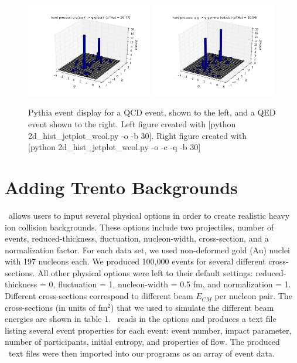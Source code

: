 \documentclass[11pt]{article}
\begin{document}
\begin{figure}[h]
\begin{center}
\includegraphics[width=0.49\textwidth]{2d_hist_jetplot.png}
\includegraphics[width=0.49\textwidth]{2d_hist_jetplot2.png}
\label{fig_label}
\caption{Pythia event display for a QCD event, shown to the left, and a QED event shown to the right.  Left figure created with [python 2d\_hist\_jetplot\_wcol.py -o -b 30]. Right figure created with [python 2d\_hist\_jetplot\_wcol.py -o -c -q -b 30]}
\end{center}
\end{figure}

\section{Adding Trento Backgrounds}
%
%
\trento\ allows users to input several physical options in order to create realistic heavy ion collision backgrounds. These options include two projectiles, number of events, reduced-thickness, fluctuation, nucleon-width, cross-section, and a normalization factor. For each data set,  we used non-deformed gold (Au) nuclei with 197 nucleons each. We produced 100,000 events for several different cross-sections. All other physical options were left to their default settings: reduced-thickness = 0, fluctuation = 1, nucleon-width = 0.5 fm, and normalization = 1. Different cross-sections correspond to different beam $E_{CM}$ per nucleon pair. The cross-sections (in units of fm$^2$) that we used to simulate the different beam energies are shown in table 1. \trento\ reads in the options and produces a text file listing several event properties for each event: event number, impact parameter, number of participants, initial entropy, and properties of flow. The produced \trento\ text files were then imported into our programs as an array of event data.
\end{document}
